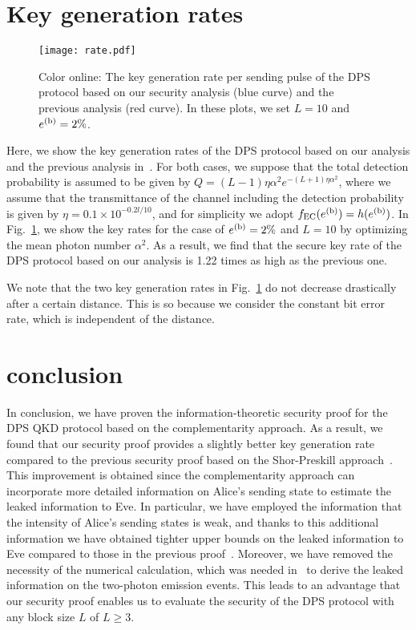 \documentclass[prl,twocolumn,superscriptaddress,nofootinbib]{revtex4}
\def\U#1{{\rm #1}}
\begin{document}
\section{Key generation rates}
\label{sec:key}

\begin{figure}[t]
\texttt{[image: rate.pdf]}
\caption{
  Color online: The key generation rate per sending pulse of the DPS protocol based on our security analysis (blue curve)
  and the previous analysis (red curve). In these plots, we set $L=10$ and $e^{(\U{b})}=2\%$. 
}
\label{fig:key}
\end{figure}
Here, we show the key generation rates of the DPS protocol based on our analysis and the previous analysis in~\cite{Kiyoshi2012dps}.
For both cases, we suppose that the total detection probability is assumed to be 
given by $Q=(L-1)\eta\alpha^2e^{-(L+1)\eta\alpha^2}$, where
we assume that the transmittance of the channel including the detection probability is given by $\eta=0.1\times 10^{-0.2l/10}$, and
for simplicity we adopt $f_{\U{EC}}(e^{(\U{b})})=h(e^{(\U{b})})$. 
In Fig.~\ref{fig:key}, we show the key rates for the case of
$e^{(\U{b})}=2\%$ and $L=10$ by optimizing the mean photon number $\alpha^2$.
As a result, we find that the secure key rate of the DPS protocol based on our analysis is 1.22 times as high as the
previous one. 

We note that the two key generation rates in Fig.~\ref{fig:key} do not decrease drastically after a certain distance.
This is so because we consider the constant bit error rate, which is independent of the distance.

\section{conclusion}
\label{sec:conc}
In conclusion, we have proven the information-theoretic security proof for the DPS QKD protocol based on 
the complementarity approach. 
As a result, we found that our security proof provides a slightly better key generation rate compared to the
previous security proof based on the Shor-Preskill approach~\cite{Kiyoshi2012dps}.
This improvement is obtained since the complementarity approach can incorporate more detailed information on Alice's sending state
to estimate the leaked information to Eve. 
In particular, we have employed the information 
that the intensity of Alice's sending states is weak, and thanks to this additional information we have obtained 
tighter upper bounds on the leaked information to Eve compared to those in the previous proof~\cite{Kiyoshi2012dps}.
Moreover, we have removed the necessity of the numerical calculation, which was needed in~\cite{Kiyoshi2012dps}  
to derive the leaked information on the two-photon emission events.
This leads to an advantage that our security proof
enables us to evaluate the security of the DPS protocol with any block size $L$ of $L\geq3$.
\end{document}
